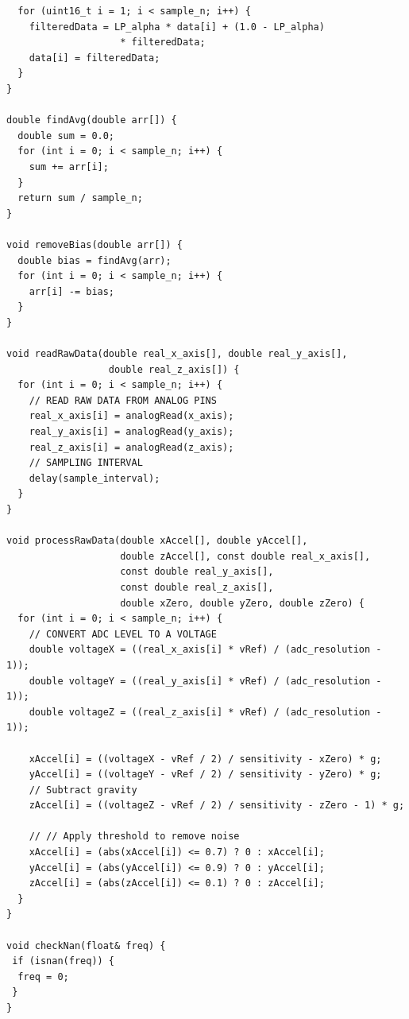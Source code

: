 \begin{verbatim}
  for (uint16_t i = 1; i < sample_n; i++) {
    filteredData = LP_alpha * data[i] + (1.0 - LP_alpha) 
                    * filteredData;
    data[i] = filteredData;
  }
}

double findAvg(double arr[]) {
  double sum = 0.0;
  for (int i = 0; i < sample_n; i++) {
    sum += arr[i];
  }
  return sum / sample_n;
}

void removeBias(double arr[]) { 
  double bias = findAvg(arr);
  for (int i = 0; i < sample_n; i++) {
    arr[i] -= bias;
  }
}

void readRawData(double real_x_axis[], double real_y_axis[], 
                  double real_z_axis[]) {
  for (int i = 0; i < sample_n; i++) {
    // READ RAW DATA FROM ANALOG PINS
    real_x_axis[i] = analogRead(x_axis);
    real_y_axis[i] = analogRead(y_axis);
    real_z_axis[i] = analogRead(z_axis);
    // SAMPLING INTERVAL
    delay(sample_interval);
  }
}

void processRawData(double xAccel[], double yAccel[], 
                    double zAccel[], const double real_x_axis[], 
                    const double real_y_axis[], 
                    const double real_z_axis[], 
                    double xZero, double yZero, double zZero) {
  for (int i = 0; i < sample_n; i++) {
    // CONVERT ADC LEVEL TO A VOLTAGE
    double voltageX = ((real_x_axis[i] * vRef) / (adc_resolution - 1));
    double voltageY = ((real_y_axis[i] * vRef) / (adc_resolution - 1));
    double voltageZ = ((real_z_axis[i] * vRef) / (adc_resolution - 1));

    xAccel[i] = ((voltageX - vRef / 2) / sensitivity - xZero) * g;
    yAccel[i] = ((voltageY - vRef / 2) / sensitivity - yZero) * g;
    // Subtract gravity
    zAccel[i] = ((voltageZ - vRef / 2) / sensitivity - zZero - 1) * g; 

    // // Apply threshold to remove noise
    xAccel[i] = (abs(xAccel[i]) <= 0.7) ? 0 : xAccel[i];
    yAccel[i] = (abs(yAccel[i]) <= 0.9) ? 0 : yAccel[i];
    zAccel[i] = (abs(zAccel[i]) <= 0.1) ? 0 : zAccel[i];
  }
}

void checkNan(float& freq) {
 if (isnan(freq)) {
  freq = 0;
 }
}
\end{verbatim}

